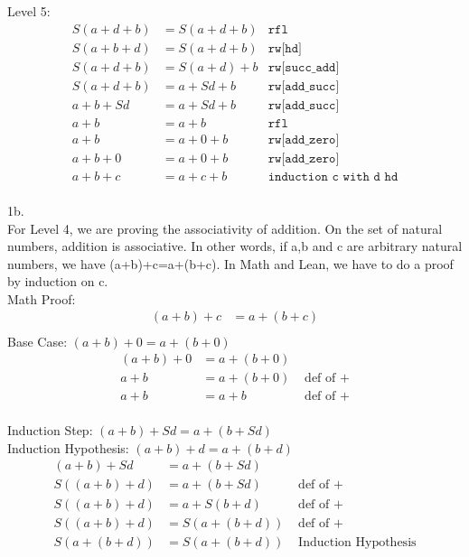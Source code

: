\documentclass{article}
\theoremstyle{theorem}
\theoremstyle{definition}
\theoremstyle{remark}
\begin{document}
Level 5:
\begin{align*}
  S(a+d+b)&=S(a+d+b) & \texttt{rfl} \\
  S(a+b+d)&=S(a+d+b)  & \texttt{rw[hd]} \\
  S(a+d+b)&=S(a+d)+b & \texttt{rw[succ\_add]} \\
  S(a+d+b)&=a+Sd+b & \texttt{rw[add\_succ]} \\
  a+b+Sd&=a+Sd+b & \texttt{rw[add\_succ]} \\
  a+b&=a+b & \texttt{rfl} \\
  a+b&=a+0+b & \texttt{rw[add\_zero]} \\
  a+b+0&=a+0+b & \texttt{rw[add\_zero]} \\
  a+b+c&=a+c+b & \texttt{induction c with d hd} \\
\end{align*}

1b. \\

For Level 4, we are proving the associativity of addition. 
On the set of natural numbers, addition is associative. 
In other words, if a,b and c are arbitrary natural numbers, we have (a+b)+c=a+(b+c).
In Math and Lean, we have to do a proof by induction on c.\\ 

Math Proof:\\ 
\begin{align*}
  (a+b)+c&=a+(b+c) \\
\end{align*}
Base Case: $(a+b)+0=a+(b+0)$\\ 
\begin{align*}
  (a+b)+0&=a+(b+0)\\
  a+b&=a+(b+0) & \text{ def of } +\\
  a+b&=a+b & \text{ def of } +\\
\end{align*}

Induction Step: $(a+b)+Sd=a+(b+Sd)$ \\

Induction Hypothesis: $(a+b)+d=a+(b+d)$ \\

\begin{align*}
  (a+b)+Sd&=a+(b+Sd)\\
  S((a+b)+d)&=a+(b+Sd) & \text{ def of } +\\
  S((a+b)+d)&=a+S(b+d) & \text{ def of } +\\
  S((a+b)+d)&=S(a+(b+d)) & \text{ def of } +\\
  S(a+(b+d))&=S(a+(b+d)) & \text{ Induction Hypothesis}\\
\end{align*}
\end{document}
